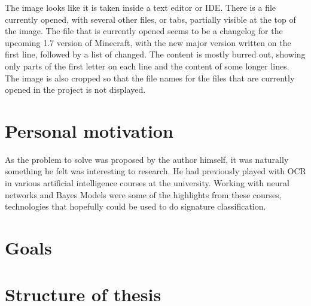 The image looks like it is taken inside a text editor or \gls{IDE}. There is a file currently opened, with several other files, or tabs, partially visible at the top of the image. The file that is currently opened seems to be a changelog for the upcoming 1.7 version of Minecraft, with the new major version written on the first line, followed by a list of changed. The content is mostly burred out, showing only parts of the first letter on each line and the content of some longer lines. The image is also cropped so that the file names for the files that are currently opened in the project is not displayed.



\section{Personal motivation}
As the problem to solve was proposed by the author himself, it was naturally something he felt was interesting to research. He had previously played with OCR in various artificial intelligence courses at the university. Working with neural networks and Bayes Models were some of the highlights from these courses, technologies that hopefully could be used to do signature classification. 

\section{Goals}

\section{Structure of thesis}
